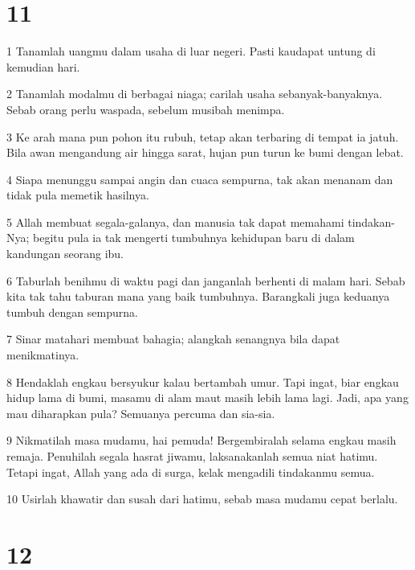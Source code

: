 \chapter{11}

\par 1 Tanamlah uangmu dalam usaha di luar negeri. Pasti kaudapat untung di kemudian hari.
\par 2 Tanamlah modalmu di berbagai niaga; carilah usaha sebanyak-banyaknya. Sebab orang perlu waspada, sebelum musibah menimpa.
\par 3 Ke arah mana pun pohon itu rubuh, tetap akan terbaring di tempat ia jatuh. Bila awan mengandung air hingga sarat, hujan pun turun ke bumi dengan lebat.
\par 4 Siapa menunggu sampai angin dan cuaca sempurna, tak akan menanam dan tidak pula memetik hasilnya.
\par 5 Allah membuat segala-galanya, dan manusia tak dapat memahami tindakan-Nya; begitu pula ia tak mengerti tumbuhnya kehidupan baru di dalam kandungan seorang ibu.
\par 6 Taburlah benihmu di waktu pagi dan janganlah berhenti di malam hari. Sebab kita tak tahu taburan mana yang baik tumbuhnya. Barangkali juga keduanya tumbuh dengan sempurna.
\par 7 Sinar matahari membuat bahagia; alangkah senangnya bila dapat menikmatinya.
\par 8 Hendaklah engkau bersyukur kalau bertambah umur. Tapi ingat, biar engkau hidup lama di bumi, masamu di alam maut masih lebih lama lagi. Jadi, apa yang mau diharapkan pula? Semuanya percuma dan sia-sia.
\par 9 Nikmatilah masa mudamu, hai pemuda! Bergembiralah selama engkau masih remaja. Penuhilah segala hasrat jiwamu, laksanakanlah semua niat hatimu. Tetapi ingat, Allah yang ada di surga, kelak mengadili tindakanmu semua.
\par 10 Usirlah khawatir dan susah dari hatimu, sebab masa mudamu cepat berlalu.

\chapter{12}

